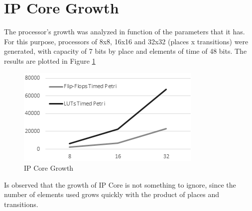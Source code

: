 \section{IP Core Growth}

	The processor's growth was analyzed in function of the parameters that it has. For this purpose, 
	processors of 8x8, 16x16 and 32x32 (places x transitions) were generated, with capacity of 7 bits 
	by place and elements of time of 48 bits. The results are plotted in Figure \ref{fig:growth}
	
	\begin{figure}[h]
			\centering
			\includegraphics[width=0.95\linewidth]{./img/ipcore}
			\caption{IP Core Growth}
			\label{fig:growth}
	\end{figure}
	
	Is observed that the growth of IP Core is not something to ignore, since the number of elements 
	used grows quickly with the product of places and transitions.	 	